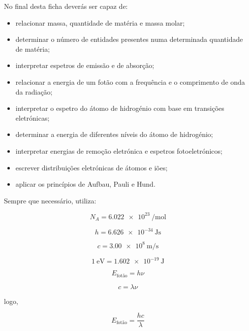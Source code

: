 \documentclass[11pt,a4paper]{article}
\begin{document}
	\begin{tcolorbox}[
		colback=eugray,
		colframe=eudark,
		title=\textbf{Objetivos de aprendizagem}
		]
		
		No final desta ficha deverás ser capaz de:
		
		\begin{itemize}[leftmargin=6mm,itemsep=1mm]
			
			\item relacionar massa, quantidade de matéria e massa molar;
			
			\item determinar o número de entidades presentes numa determinada
			quantidade de matéria;
			
			\item interpretar espetros de emissão e de absorção;
			
			\item relacionar a energia de um fotão com a frequência e o comprimento
			de onda da radiação;
			
			\item interpretar o espetro do átomo de hidrogénio com base em
			transições eletrónicas;
			
			\item determinar a energia de diferentes níveis do átomo de hidrogénio;
			
			\item interpretar energias de remoção eletrónica e espetros
			fotoeletrónicos;
			
			\item escrever distribuições eletrónicas de átomos e iões;
			
			\item aplicar os princípios de Aufbau, Pauli e Hund.
			
		\end{itemize}
		
	\end{tcolorbox}
	
	
	\begin{dados}
		
		Sempre que necessário, utiliza:
		
		\[
		N_A=\SI{6.022e23}{\per\mole}
		\]
		
		\[
		h=\SI{6.626e-34}{\joule\second}
		\]
		
		\[
		c=\SI{3.00e8}{\meter\per\second}
		\]
		
		\[
		1\ \mathrm{eV}
		=
		\SI{1.602e-19}{\joule}
		\]
		
		\[
		E_{\text{fotão}}=h\nu
		\]
		
		\[
		c=\lambda\nu
		\]
		
		logo,
		
		\[
		\boxed{
			E_{\text{fotão}}
			=
			\frac{hc}{\lambda}
		}
		\]
		
	\end{dados}
	
\end{document}
